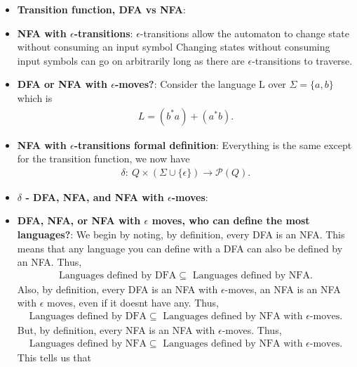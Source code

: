 \documentclass{report}
\begin{document}
\begin{itemize}
        \item \textbf{Transition function, DFA vs NFA}:
            \bigbreak \noindent 
        \item \textbf{NFA with $\epsilon$-transitions}: $\epsilon$-transitions allow the automaton to change state without
            consuming an input symbol
            \bigbreak \noindent 
            Changing states without consuming input symbols can go on arbitrarily long as there are $\epsilon$-transitions to traverse.
        \item \textbf{DFA or NFA with $\epsilon$-moves?}: Consider the language L over $\Sigma = \{a, b\}$ which is
            \begin{align*}
                L = (b^{*}a) + (a^{*}b)
            .\end{align*}
            \bigbreak \noindent 
        \item \textbf{NFA with $\epsilon$-transitions formal definition}: Everything is the same except for the transition function, we now have
            \begin{align*}
                \delta:\ Q \times (\Sigma \cup \{\epsilon\}) \to \mathcal{P}(Q)
            .\end{align*}
            \pagebreak \bigbreak \noindent 
        \item \textbf{$\delta$ - DFA, NFA, and NFA with $\epsilon$-moves}:
            \bigbreak \noindent 
        \item \textbf{DFA, NFA, or NFA with $\epsilon$ moves, who can define the most languages?}: We begin by noting, by definition, every DFA is an NFA. This means that any language you can define with a DFA can also be defined by an NFA. Thus,
            \begin{align*}
                \text{Languages defined by DFA} \subseteq \text{ Languages defined by NFA}
            .\end{align*}
            Also, by definition, every DFA is an NFA with $\epsilon$-moves, an NFA is an NFA with $\epsilon$ moves, even if it doesnt have any. Thus,
            \begin{align*}
                \text{Languages defined by DFA} \subseteq \text{ Languages defined by NFA with $\epsilon$-moves}
            .\end{align*}
            \bigbreak \noindent 
            But, by definition, every NFA is an NFA with $\epsilon$-moves. Thus,
            \begin{align*}
                \text{Languages defined by NFA} \subseteq \text{ Languages defined by NFA with $\epsilon$-moves}
            .\end{align*}
            \bigbreak \noindent 
            This tells us that
            \begin{itemize}
                

\end{itemize}
\end{itemize}
\end{document}

